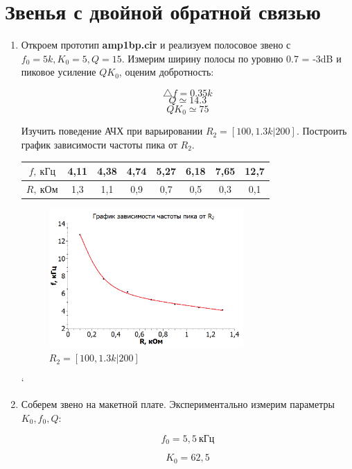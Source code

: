 \documentclass[a4paper, 12pt]{article}%
\begin{document}
\section{Звенья с двойной обратной связью}

\begin{enumerate}

\item Откроем прототип \textbf{amp1bp.cir} и реализуем полосовое звено с $f_0 = 5k, K_0 = 5, Q = 15$. Измерим ширину полосы по уровню 0.7 = -3dB и пиковое усиление $QK_0$, оценим добротность:

\[\bigtriangleup f = 0.35k\]
\[Q \simeq 14.3\]
\[QK_0 \simeq 75\]

Изучить поведение АЧХ при варьировании $R_2 = [100, 1.3k|200]$. Построить график зависимости частоты пика от $R_2$.

\begin{center}
\begin{tabular}{|c|c|c|c|c|c|c|c|}
\hline 
$f, \: \text{кГц}$ & 4,11 & 4,38 & 4,74 & 5,27 & 6,18 & 7,65 & 12,7 \\ 
\hline 
$R, \: \text{кОм}$ & 1,3 & 1,1 & 0,9 & 0,7 & 0,5 & 0,3 & 0,1 \\ 
\hline 
\end{tabular} 
\end{center}

\begin{figure}[h!]
\centering	
\includegraphics[width=0.7\textwidth]{images/5_1.png}
\caption{$R_2 = [100, 1.3k|200]$}
\label{2_5-2}
\end{figure}`

\item Соберем звено на макетной плате. Экспериментально измерим параметры $K_0, f_0, Q$:

\[f_0 = 5,5 \: \text{кГц}\]

\[K_0 = 62,5\]


\end{enumerate}
\end{document}

